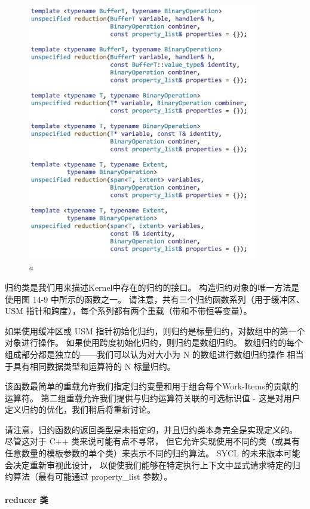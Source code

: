 \begin{figure}[H]
	\centering
	\includegraphics[width=0.9\textwidth]{figs/F14.9.png}
	\caption{\textit{a }}
\end{figure}

归约类是我们用来描述Kernel中存在的归约的接口。 构造归约对象的唯一方法是使用图 14-9 中所示的函数之一。 
请注意，共有三个归约函数系列（用于缓冲区、USM 指针和跨度），每个系列都有两个重载（带和不带恒等变量）。

如果使用缓冲区或 USM 指针初始化归约，则归约是标量归约，对数组中的第一个对象进行操作。 
如果使用跨度初始化归约，则归约是数组归约。 
数组归约的每个组成部分都是独立的——我们可以认为对大小为 N 的数组进行数组归约操作
相当于具有相同数据类型和运算符的 N 标量归约。

该函数最简单的重载允许我们指定归约变量和用于组合每个Work-Items的贡献的运算符。 
第二组重载允许我们提供与归约运算符关联的可选标识值 - 这是对用户定义归约的优化，我们稍后将重新讨论。

请注意，归约函数的返回类型是未指定的，并且归约类本身完全是实现定义的。 
尽管这对于 C++ 类来说可能有点不寻常，
但它允许实现使用不同的类（或具有任意数量的模板参数的单个类）来表示不同的归约算法。 
SYCL 的未来版本可能会决定重新审视此设计，
以便使我们能够在特定执行上下文中显式请求特定的归约算法（最有可能通过 property\_list 参数）。

\paragraph{reducer 类}

